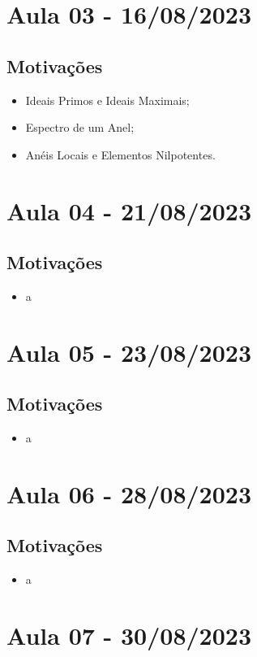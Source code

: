 \documentclass{article}
\begin{document}
\section{Aula 03 - 16/08/2023}
\subsection{Motivações}
\begin{itemize}
  \item Ideais Primos e Ideais Maximais;
  \item Espectro de um Anel;
  \item Anéis Locais e Elementos Nilpotentes.
\end{itemize}
\newpage

\section{Aula 04 - 21/08/2023}
\subsection{Motivações}
\begin{itemize}
  \item a
\end{itemize}
\newpage

\section{Aula 05 - 23/08/2023}
\subsection{Motivações}
\begin{itemize}
  \item a
\end{itemize}
\newpage

\section{Aula 06 - 28/08/2023}
\subsection{Motivações}
\begin{itemize}
  \item a
\end{itemize}
\newpage

\section{Aula 07 - 30/08/2023}
\end{document}

